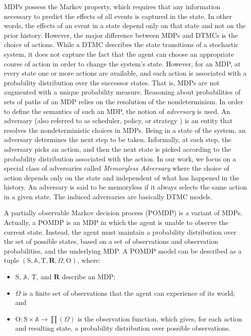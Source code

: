 MDPs possess the Markov property, which requires that any information necessary to predict the effects of all events is captured in the state. In other words, the effects of an event in a state depend only on that state and not on the prior history. However, the major difference between MDPs and DTMCs is the choice of actions. While a DTMC describes the state transitions of a stochastic system, it does not capture the fact that the agent can choose an appropriate course of action in order to change the system's state. However, for an MDP, at every state one or more actions are available, and each action is associated with a probability distribution over the successor states. That is, MDPs are not augmented with a unique
probability measure. Reasoning about probabilities of sets of
paths of an MDP relies on the resolution of the nondeterminism. In
order to define the semantics of such an MDP, the notion of \textit{adversary} is used. An adversary (also referred to as scheduler, policy, or strategy \cite{Baier2008,Vardi1985}) is an entity that resolves the nondeterministic choices in MDPs. Being in a state of the system, an adversary determines the next step to be taken. %
Informally, at each step, the adversary picks an action, and then the next
state is picked according to the probability distribution
associated with the action. In our work, we focus on a special
class of adversaries called \emph{Memoryless Adversary} \cite{Forejt2011} where the choice of action depends only on the state and independent of what has happened in the history. An adversary is said to be memoryless if it always selects the same action in a given state. The induced adversaries are basically DTMC models.

A partially observable Markov decision process (POMDP) is a variant of MDPs. Actually, a POMDP is an MDP in which the agent is unable to observe the current state. Instead, the agent must maintain a probability distribution over the set of possible states, based on a set of observations and observation probabilities, and the underlying MDP. A POMDP model \cite{Kaelbling98} can be described as a tuple $(\mathrm{S},\mathbb{A},\mathrm{T},\mathbf{R},\Omega,\mathrm{O})$, where:

\begin{itemize}

  \item $\mathrm{S}$, $\mathbb{A}$, $\mathrm{T}$, and $\mathbf{R}$ describe an MDP;
  \item $\Omega$ is a finite set of observations that the agent can experience of its world; and
  \item $\mathrm{O}: \mathrm{S} \times \mathbb{A}\to \prod(\Omega)$ is the observation function, which gives, for each action and resulting state, a probability distribution over possible observations.

\end{itemize}



